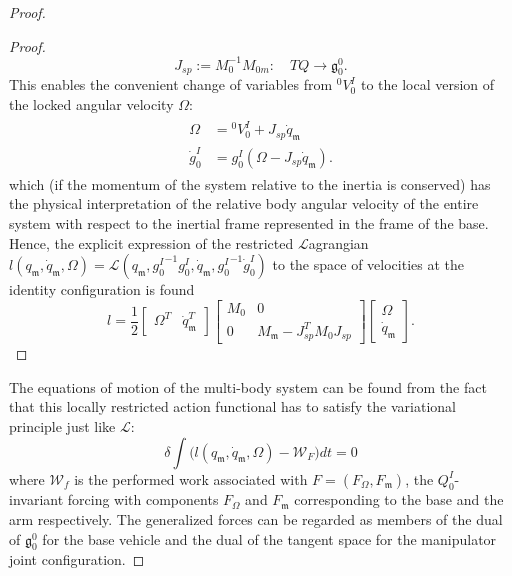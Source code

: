 \documentclass[lettersize,journal]{IEEEtran}
\def \g  {\mathfrak{g}}
\def \L {\mathcal{L}}
\begin{document}
\begin{proof}[Proof]
\begin{proof}[Proof]
\begin{equation}
  J_{sp} := M_0^{-1}M_{0m}: \quad  TQ\rightarrow \g^0_0.
\end{equation}
This enables the convenient change of variables from ${}^0V_0^I$ to the local version of the locked angular velocity $\Omega$:
\begin{align}
    \begin{split}
       \Omega&={}^0V_0^I+J_{sp}\dot{q}_\mathfrak{m}\\ \dot{g}^I_0&=g^I_0(\Omega-J_{sp}\dot{q}_\mathfrak{m}). 
    \end{split}
\end{align}
which (if the momentum of the system relative to the inertia is conserved) has the physical interpretation of the relative body angular velocity of the entire system with respect to the inertial frame represented in the frame of the base.
Hence, the explicit expression of the restricted $\L$agrangian $l(q_\mathfrak{m},\dot{q}_\mathfrak{m},\Omega)=\mathcal{L}(q_\mathfrak{m},{g^I_0}^{-1}{g}^I_0,\dot{q}_\mathfrak{m},{g^I_0}^{-1}\dot{g}^I_0)$ to the space of velocities at the identity configuration is found 
\begin{equation}
    l=\frac{1}{2}\begin{bmatrix}\Omega^T&\dot{q}_\mathfrak{m}^T\end{bmatrix} \begin{bmatrix}M_0 & 0\\ 0 & M_\mathfrak{m}-J_{sp}^TM_0J_{sp}\end{bmatrix} \begin{bmatrix}\Omega\\\dot{q}_\mathfrak{m}\end{bmatrix}.
\end{equation}
\end{proof}
The equations of motion of the multi-body system can be found from the fact that this locally restricted action functional has to satisfy the variational principle just like $\L$:
\begin{equation}
    \delta \int \Big(l(q_\mathfrak{m},\dot{q}_\mathfrak{m},\Omega)-\mathcal{W}_F\Big)dt=0
\end{equation}
where $\mathcal{W}_f$ is the performed work associated with $F=(F_\Omega,F_\mathfrak{m})$, the $Q^I_0$-invariant forcing with components $F_\Omega$ and $F_\mathfrak{m}$ corresponding to the base and the arm respectively. The generalized forces can be regarded as members of the dual of $\g^0_0$ for the base vehicle and the dual of the tangent space for the manipulator joint configuration. 

\end{proof}
\end{document}
